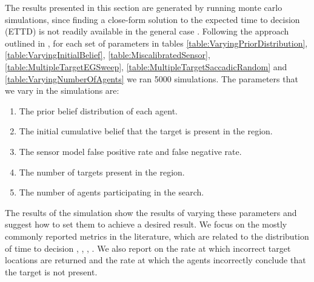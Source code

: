 



The results presented in this section are generated by running monte carlo simulations, since finding a close-form solution to the expected time to decision (ETTD) is not readily available in the general case \cite{Chung2012AnalysisStrategies}. Following the approach outlined in \cite{Chung2007ASearch}, for each set of parameters in tables \ref{table:VaryingPriorDistribution}, \ref{table:VaryingInitialBelief}, \ref{table:MiscalibratedSensor}, \ref{table:MultipleTargetEGSweep}, \ref{table:MultipleTargetSaccadicRandom} and \ref{table:VaryingNumberOfAgents} we ran 5000 simulations. The parameters that we vary in the simulations are: 
\begin{enumerate}
    \item The prior belief distribution of each agent.
    \item The initial cumulative belief that the target is present in the region.
    \item The sensor model false positive rate and false negative rate.
    \item The number of targets present in the region.
    \item The number of agents participating in the search.
\end{enumerate}
The results of the simulation show the results of varying these parameters and suggest how to set them to achieve a desired result. We focus on the mostly commonly reported metrics in the literature, which are  related to the distribution of time to decision \cite{Chung2012AnalysisStrategies}, \cite{Waharte2010ProbabilisticRAVs}, \cite{Waharte2010SupportingRAVs}, \cite{Lau2007OptimalEnvironments}. We also report on the rate at which incorrect target locations are returned and the rate at which the agents incorrectly conclude that the target is not present. 

